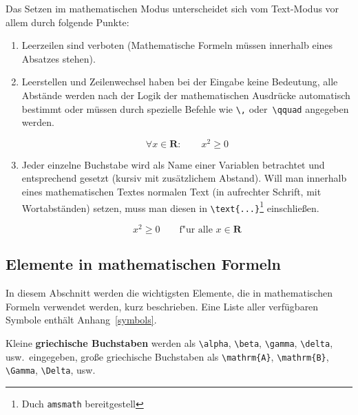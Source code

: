 Das Setzen im mathematischen Modus unterscheidet sich vom
Text-Modus vor allem durch folgende Punkte:
\begin{enumerate}
\item Leerzeilen sind verboten (Mathematische Formeln müssen
  innerhalb eines Absatzes stehen).

\item Leerstellen und Zeilenwechsel haben bei der Eingabe keine
  Bedeutung, alle Abstände werden nach der Logik der
  mathematischen Ausdrücke automatisch bestimmt oder müssen
  durch spezielle Befehle wie \lstinline|\,| oder~\lstinline|\qquad|
  angegeben werden.

\begin{LTXexample}
\begin{equation}
\forall x \in \mathbf{R}:
\qquad x^{2} \geq 0
\end{equation}
\end{LTXexample}

 
\item Jeder einzelne Buchstabe wird als Name einer Variablen
  betrachtet und entsprechend gesetzt (kursiv mit
  zusätzlichem Abstand).  Will man innerhalb eines
  mathematischen Textes normalen Text (in aufrechter Schrift, mit
  Wortabständen) setzen, muss man diesen in
  \lstinline|\text{...}|\footnote{Duch \texttt{amsmath} bereitgestell} einschließen.

\begin{LTXexample}
\begin{equation}
x^{2} \geq 0\qquad
\text{f"ur alle }
x \in \mathbf{R}
\end{equation}
\end{LTXexample}

 
 
\end{enumerate}
 
\subsection{Elemente in mathematischen Formeln}
 
In diesem Abschnitt werden die wichtigsten Elemente, die in
mathematischen Formeln verwendet werden, kurz beschrieben.  Eine
Liste aller verfügbaren Symbole enthält
Anhang~\vref{symbols}.
 
\bigskip

Kleine \textbf{griechische Buchstaben} werden als \lstinline|\alpha|,
\lstinline|\beta|, \lstinline|\gamma|, \lstinline|\delta|, usw.\ eingegeben,
große griechische Buchstaben als \lstinline|\mathrm{A}|,
\lstinline|\mathrm{B}|, \lstinline|\Gamma|, \lstinline|\Delta|, usw.


